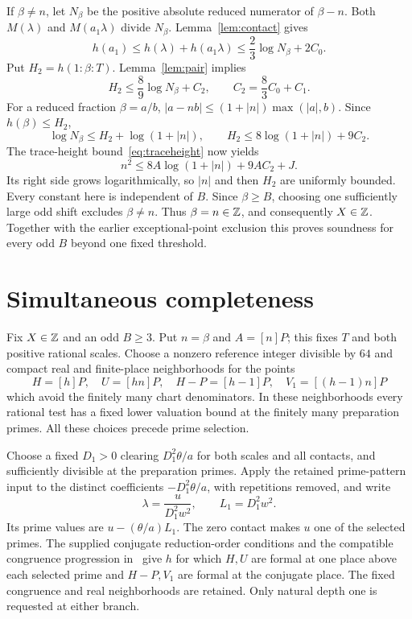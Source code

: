 \documentclass[11pt,a4paper]{article}
\begin{document}
If $\beta\ne n$, let $N_\beta$ be the positive absolute reduced
numerator of $\beta-n$. Both $M(\lambda)$ and $M(a_1\lambda)$ divide
$N_\beta$. Lemma~\ref{lem:contact} gives
\[
 h(a_1)\le h(\lambda)+h(a_1\lambda)
               \le\frac23\log N_\beta+2C_0.
\]
Put $H_2=h(1:\beta:T)$. Lemma~\ref{lem:pair} implies
\[
 H_2\le\frac89\log N_\beta+C_2,\qquad C_2=\frac83C_0+C_1.
\]
For a reduced fraction $\beta=a/b$,
$|a-nb|\le(1+|n|)\max(|a|,b)$. Since $h(\beta)\le H_2$,
\[
 \log N_\beta\le H_2+\log(1+|n|),\qquad
 H_2\le8\log(1+|n|)+9C_2.
\]
The trace-height bound~\eqref{eq:traceheight} now yields
\[
 n^2\le8A\log(1+|n|)+9AC_2+J.
\]
Its right side grows logarithmically, so $|n|$ and then $H_2$ are
uniformly bounded. Every constant here is independent of $B$.
Since $\beta\ge B$, choosing one sufficiently large odd shift excludes
$\beta\ne n$. Thus $\beta=n\in\mathbb Z$, and consequently $X\in\mathbb Z$.
Together with the earlier exceptional-point exclusion this proves
soundness for every odd $B$ beyond one fixed threshold.

\section{Simultaneous completeness}

Fix $X\in\mathbb Z$ and an odd $B\ge3$. Put $n=\beta$ and $A=[n]P$;
this fixes $T$ and both positive rational scales. Choose a nonzero
reference integer divisible by $64$ and compact real and finite-place
neighborhoods for the points
\[
 H=[h]P,\quad U=[hn]P,\quad H-P=[h-1]P,\quad
 V_1=[(h-1)n]P
\]
which avoid the finitely many chart denominators. In these neighborhoods
every rational test has a fixed lower valuation bound at the finitely
many preparation primes. All these choices precede prime selection.

Choose a fixed $D_1>0$ clearing $D_1^2\theta/a$ for both scales and
all contacts, and sufficiently divisible at the preparation primes.
Apply the retained prime-pattern input to the distinct coefficients
$-D_1^2\theta/a$, with repetitions removed, and write
\[
                \lambda=\frac{u}{D_1^2w^2},\qquad L_1=D_1^2w^2.
\]
Its prime values are $u-(\theta/a)L_1$. The zero contact makes $u$
one of the selected primes. The supplied conjugate reduction-order
conditions and the compatible congruence progression in~\cite{Dependencies}
give $h$ for which $H,U$ are formal at one place above each selected
prime and $H-P,V_1$ are formal at the conjugate place. The fixed
congruence and real neighborhoods are retained. Only natural depth one
is requested at either branch.
\end{document}
